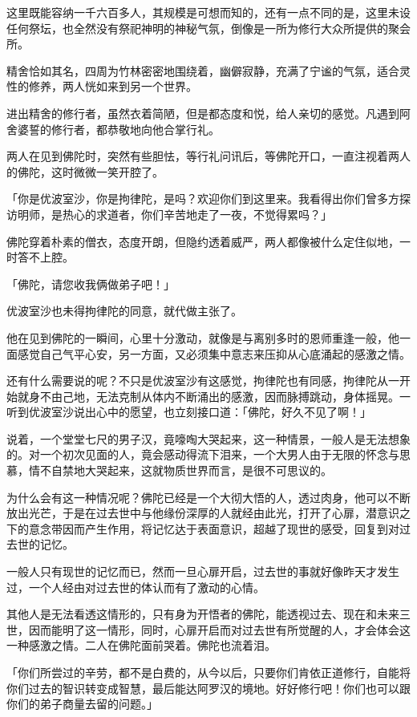 \documentclass[twoside,openany]{book}
\begin{document}
这里既能容纳一千六百多人，其规模是可想而知的，还有一点不同的是，这里未设任何祭坛，也全然没有祭祀神明的神秘气氛，倒像是一所为修行大众所提供的聚会所。

精舍恰如其名，四周为竹林密密地围绕着，幽僻寂静，充满了宁谧的气氛，适合灵性的修养，两人恍如来到另一个世界。

进出精舍的修行者，虽然衣着简陋，但是都态度和悦，给人亲切的感觉。凡遇到阿舍婆誓的修行者，都恭敬地向他合掌行礼。

两人在见到佛陀时，突然有些胆怯，等行礼问讯后，等佛陀开口，一直注视着两人的佛陀，这时微微一笑开腔了。

「你是优波室沙，你是拘律陀，是吗？欢迎你们到这里来。我看得出你们曾多方探访明师，是热心的求道者，你们辛苦地走了一夜，不觉得累吗？」

佛陀穿着朴素的僧衣，态度开朗，但隐约透着威严，两人都像被什么定住似地，一时答不上腔。

「佛陀，请您收我俩做弟子吧！」

优波室沙也未得拘律陀的同意，就代做主张了。

他在见到佛陀的一瞬间，心里十分激动，就像是与离别多时的恩师重逢一般，他一面感觉自己气平心安，另一方面，又必须集中意志来压抑从心底涌起的感激之情。

还有什么需要说的呢？不只是优波室沙有这感觉，拘律陀也有同感，拘律陀从一开始就身不由己地，无法克制从体内不断涌出的感激，因而脉搏跳动，身体摇晃。一听到优波室沙说出心中的愿望，也立刻接口道：「佛陀，好久不见了啊！」

说着，一个堂堂七尺的男子汉，竟嚎啕大哭起来，这一种情景，一般人是无法想象的。对一个初次见面的人，竟会感动得流下泪来，一个大男人由于无限的怀念与思慕，情不自禁地大哭起来，这就物质世界而言，是很不可思议的。

为什么会有这一种情况呢？佛陀已经是一个大彻大悟的人，透过肉身，他可以不断放出光芒，于是在过去世中与他缘份深厚的人就经由此光，打开了心扉，潜意识之下的意念带因而产生作用，将记忆达于表面意识，超越了现世的感受，回复到对过去世的记忆。

一般人只有现世的记忆而已，然而一旦心扉开启，过去世的事就好像昨天才发生过，一个人经由对过去世的体认而有了激动的心情。

其他人是无法看透这情形的，只有身为开悟者的佛陀，能透视过去、现在和未来三世，因而能明了这一情形，同时，心扉开启而对过去世有所觉醒的人，才会体会这一种感激之情。二人在佛陀面前哭着。佛陀也流着泪。

「你们所尝过的辛劳，都不是白费的，从今以后，只要你们肯依正道修行，自能将你们过去的智识转变成智慧，最后能达阿罗汉的境地。好好修行吧！你们也可以跟你们的弟子商量去留的问题。」
\end{document}
